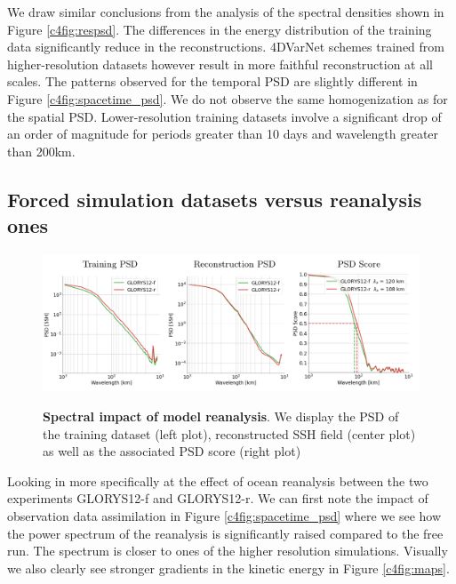 \begin{bibunit}
We draw similar conclusions from the analysis of 
the spectral densities shown in Figure \ref{c4fig:respsd}. The differences in the energy distribution of the training data significantly reduce in the reconstructions. 4DVarNet schemes trained from higher-resolution datasets however result in more faithful reconstruction at all scales.
The patterns observed for the temporal PSD are slightly different in Figure \ref{c4fig:spacetime_psd}. We do not observe the same homogenization as for the spatial PSD. Lower-resolution training datasets involve a significant drop 
of an order of magnitude for periods greater than 10 days and wavelength greater than 200km.

\subsection{Forced simulation datasets versus reanalysis ones}
\label{c4ssec:reanalysis}

\begin{figure}[h]
\small
\begin{center}
    
\includegraphics[width=\linewidth]{./00_Simulearning/standalone_figures/psd_rea.png}
\caption{\textbf{Spectral impact of model reanalysis}. We display the PSD of the training dataset (left plot), reconstructed SSH field (center plot) as well as the associated PSD score (right plot)}
\vspace{-5mm}
\label{c4fig:reapsd}
\end{center}
\end{figure}
Looking in more specifically at the effect of ocean reanalysis between the two experiments GLORYS12-f and GLORYS12-r. We can first note the impact of observation data assimilation in Figure \ref{c4fig:spacetime_psd} where we see how the power spectrum of the reanalysis is significantly raised compared to the free run. The spectrum is closer to ones of the higher resolution simulations. Visually we also clearly see stronger gradients in the kinetic energy in Figure \ref{c4fig:maps}.


\end{bibunit}
